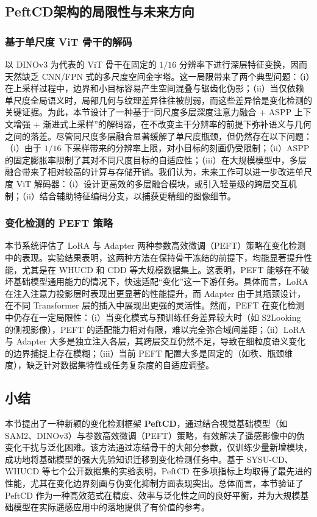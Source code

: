 \subsection{PeftCD架构的局限性与未来方向}
\subsubsection{基于单尺度 ViT 骨干的解码}
以 DINOv3 为代表的 ViT 骨干在固定的 $1/16$ 分辨率下进行深层特征变换，因而天然缺乏 CNN/FPN 式的多尺度空间金字塔。这一局限带来了两个典型问题：（i）在上采样过程中，边界和小目标容易产生空间混叠与锯齿化伪影；（ii）当仅依赖单尺度全局语义时，局部几何与纹理差异往往被削弱，而这些差异恰是变化检测的关键证据。为此，本节设计了一种基于“同尺度多层深度注意力融合 + ASPP 上下文增强 + 渐进式上采样”的解码器，在不改变主干分辨率的前提下弥补语义与几何之间的落差。尽管同尺度多层融合显著缓解了单尺度瓶颈，但仍然存在以下问题：（i）由于 $1/16$ 下采样带来的分辨率上限，对小目标的刻画仍受限制；（ii）ASPP 的固定膨胀率限制了其对不同尺度目标的自适应性；（iii）在大规模模型中，多层融合带来了相对较高的计算与存储开销。我们认为，未来工作可以进一步改进单尺度 ViT 解码器：（i）设计更高效的多层融合模块，或引入轻量级的跨层交互机制；（ii）结合辅助特征编码分支，以捕获更精细的图像细节。

\subsubsection{变化检测的 PEFT 策略}
本节系统评估了 LoRA 与 Adapter 两种参数高效微调（PEFT）策略在变化检测中的表现。实验结果表明，这两种方法在保持骨干冻结的前提下，均能显著提升性能，尤其是在 WHUCD 和 CDD 等大规模数据集上。这表明，PEFT 能够在不破坏基础模型通用能力的情况下，快速适配“变化”这一下游任务。具体而言，LoRA 在注入注意力投影层时表现出更显著的性能提升，而 Adapter 由于其瓶颈设计，在不同 Transformer 层的插入中展现出更强的灵活性。然而，PEFT 在变化检测中仍存在一定局限性：（i）当变化模式与预训练任务差异较大时（如 S2Looking 的侧视影像），PEFT 的适配能力相对有限，难以完全弥合域间差距；（ii）LoRA 与 Adapter 大多是独立注入各层，其跨层交互仍然不足，导致在细粒度语义变化的边界捕捉上存在模糊；（iii）当前 PEFT 配置大多是固定的（如秩、瓶颈维度），缺乏针对数据集特性或任务复杂度的自适应调整。

\subsection{小结}
本节提出了一种新颖的变化检测框架 \textbf{PeftCD}，通过结合视觉基础模型（如 SAM2、DINOv3）与参数高效微调（PEFT）策略，有效解决了遥感影像中的伪变化干扰与泛化困难。该方法通过冻结骨干的大部分参数，仅训练少量新增模块，成功地将基础模型的强大先验知识迁移到变化检测任务中。基于 SYSU-CD、WHUCD 等七个公开数据集的实验表明，PeftCD 在多项指标上均取得了最先进的性能，尤其在变化边界刻画与伪变化抑制方面表现突出。总体而言，本节验证了 PeftCD 作为一种高效范式在精度、效率与泛化性之间的良好平衡，并为大规模基础模型在实际遥感应用中的落地提供了有价值的参考。
